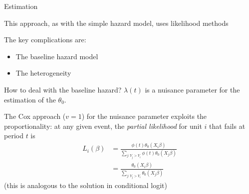 \documentclass[notes,11pt, aspectratio=169]{beamer}
\newenvironment{wideitemize}{\itemize\addtolength{\itemsep}{10pt}}{\enditemize}
\begin{document}
\begin{frame}{Estimation}
  \begin{wideitemize}
  \item This approach, as with the simple hazard model, uses likelihood methods
  \item The key complications are:
    \begin{itemize}
    \item The baseline hazard model
    \item The heterogeneity
    \end{itemize}
  \item How to deal with the baseline hazard? $\lambda(t)$ is a
    nuisance parameter for the estimation of the $\theta_{0}$.
  \item The Cox approach ($v = 1$) for the nuisance parameter
    exploits the proportionality: at any given event, the
    \emph{partial likelihood} for unit $i$ that fails at period
    $t$ is
    \begin{align*}
      L_{i}(\beta) &= \frac{\phi(t)\theta_0(X_{i}\beta)}{\sum_{j : Y_{j} > Y_{i}} \phi(t)\theta_0(X_{j}\beta)}\\
                   &= \frac{\theta_0(X_{i}\beta)}{\sum_{j: Y_{j} > Y_{i}} \theta_0(X_{j}\beta)}
    \end{align*}
    (this is analogous to the solution in conditional logit)
  \end{wideitemize}
\end{frame}
\end{document}
